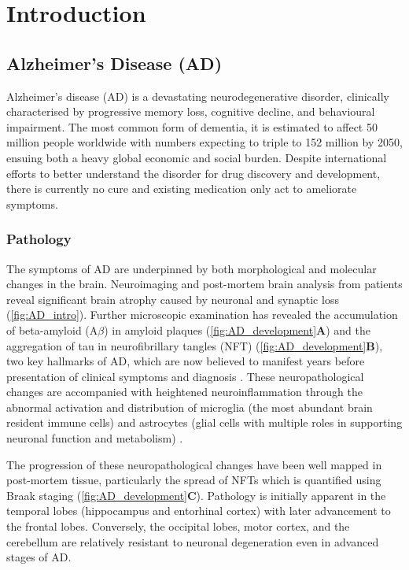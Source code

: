\chapter{Introduction}

\section{Alzheimer's Disease (AD)}

Alzheimer’s disease (AD) is a devastating neurodegenerative disorder, clinically characterised by progressive memory loss, cognitive decline, and behavioural impairment. The most common form of dementia, it is estimated to affect 50 million people worldwide with numbers expecting to triple to 152 million by 2050, ensuing both a heavy global economic and social burden\cite{International2020}. Despite international efforts to better understand the disorder for drug discovery and development, there is currently no cure and existing medication only act to ameliorate symptoms.

\subsection{Pathology}
The symptoms of AD are underpinned by both morphological and molecular changes in the brain. Neuroimaging and post-mortem brain analysis from patients reveal significant brain atrophy caused by neuronal and synaptic loss\cite{Selkoe1991,Perl2010} (\cref{fig:AD_intro}). Further microscopic examination has revealed the accumulation of beta-amyloid (A$\beta$) in amyloid plaques (\cref{fig:AD_development}\textbf{A}) and the aggregation of tau in neurofibrillary tangles (NFT) (\cref{fig:AD_development}\textbf{B}), two key hallmarks of AD, which are now believed to manifest years before presentation of clinical symptoms and diagnosis \cite{Sperling2011}. These neuropathological changes are accompanied with heightened neuroinflammation through the abnormal activation and distribution of microglia (the most abundant brain resident immune cells) and astrocytes (glial cells with multiple roles in supporting neuronal function and metabolism) \cite{Heneka2015}. 

The progression of these neuropathological changes have been well mapped in post-mortem tissue, particularly the spread of NFTs which is quantified using Braak staging\cite{H1991} (\cref{fig:AD_development}\textbf{C}). Pathology is initially apparent in the temporal lobes (hippocampus and entorhinal cortex) with later advancement to the frontal lobes. Conversely, the occipital lobes, motor cortex, and the cerebellum are relatively resistant to neuronal degeneration even in advanced stages of AD\cite{Xu2019}.

